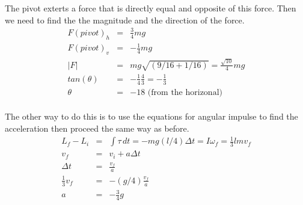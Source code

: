 \documentclass[11pt]{amsart}
\begin{document}
The pivot exterts a force that is directly equal and opposite of this force. Then we need to find the the magnitude and the direction of the force. \\
\begin{eqnarray*} 
F(pivot)_{h} &=& \frac{3}{4}mg \\
F(pivot)_{v} &=& -\frac{1}{4}mg \\
|F| &=& mg\sqrt{(9/16+1/16)} = \frac{\sqrt{10}}{4}mg \\
tan(\theta) &=& -\frac{1}{4}\frac{4}{3} = -\frac{1}{3} \\
\theta &=& -18 \mbox{ (from the horizonal)} 
\end{eqnarray*} \\
The other way to do this is to use the equations for  angular impulse to find the acceleration then proceed the same way as before. \\
\begin{eqnarray*} 
L_{f}-L_{i} &=& \int{\tau\,dt} = -mg(l/4)\Delta{t} = I\omega_{f} = \frac{1}{3}lmv_{f} \\
v_{f} &=& v_{i}+a\Delta{t} \\
\Delta{t} &=& \frac{v_{f}}{a} \\
\frac{1}{3}v_{f} &=&- (g/4)\frac{v_{f}}{a} \\
a &=& -\frac{3}{4}g
\end{eqnarray*} \\
\end{document}
